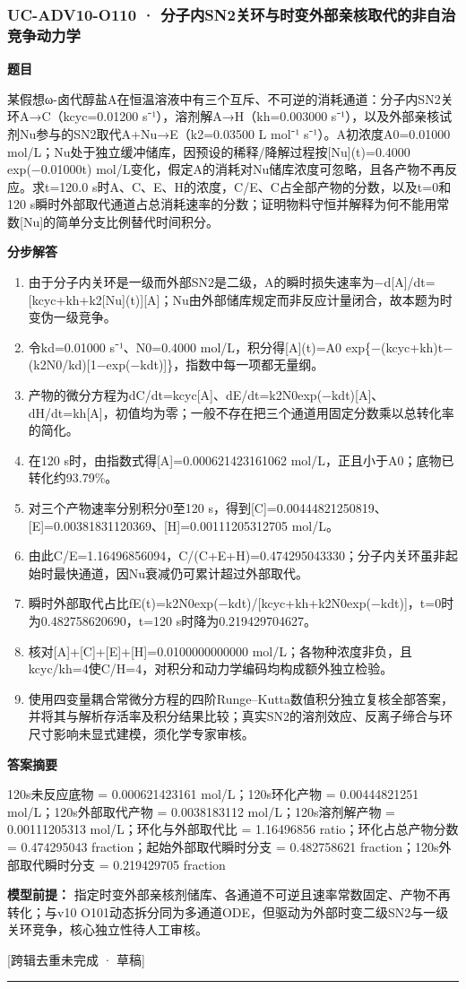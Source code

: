 \documentclass[UTF8,11pt,a4paper]{ctexart}
\begin{document}
\subsubsection*{UC-ADV10-O110 · 分子内SN2关环与时变外部亲核取代的非自治竞争动力学}
\noindent\textbf{题目}\par
某假想ω-卤代醇盐A在恒温溶液中有三个互斥、不可逆的消耗通道：分子内SN2关环A→C（kcyc=0.01200 s⁻¹），溶剂解A→H（kh=0.003000 s⁻¹），以及外部亲核试剂Nu参与的SN2取代A+Nu→E（k2=0.03500 L mol⁻¹ s⁻¹）。A初浓度A0=0.01000 mol/L；Nu处于独立缓冲储库，因预设的稀释/降解过程按[Nu](t)=0.4000 exp(−0.01000t) mol/L变化，假定A的消耗对Nu储库浓度可忽略，且各产物不再反应。求t=120.0 s时A、C、E、H的浓度，C/E、C占全部产物的分数，以及t=0和120 s瞬时外部取代通道占总消耗速率的分数；证明物料守恒并解释为何不能用常数[Nu]的简单分支比例替代时间积分。\par
\medskip\noindent\textbf{分步解答}
\begin{enumerate}
\item 由于分子内关环是一级而外部SN2是二级，A的瞬时损失速率为−d[A]/dt=[kcyc+kh+k2[Nu](t)][A]；Nu由外部储库规定而非反应计量闭合，故本题为时变伪一级竞争。
\item 令kd=0.01000 s⁻¹、N0=0.4000 mol/L，积分得[A](t)=A0 exp\{−(kcyc+kh)t−(k2N0/kd)[1−exp(−kdt)]\}，指数中每一项都无量纲。
\item 产物的微分方程为dC/dt=kcyc[A]、dE/dt=k2N0exp(−kdt)[A]、dH/dt=kh[A]，初值均为零；一般不存在把三个通道用固定分数乘以总转化率的简化。
\item 在120 s时，由指数式得[A]=0.000621423161062 mol/L，正且小于A0；底物已转化约93.79\%。
\item 对三个产物速率分别积分0至120 s，得到[C]=0.00444821250819、[E]=0.00381831120369、[H]=0.00111205312705 mol/L。
\item 由此C/E=1.16496856094，C/(C+E+H)=0.474295043330；分子内关环虽非起始时最快通道，因Nu衰减仍可累计超过外部取代。
\item 瞬时外部取代占比fE(t)=k2N0exp(−kdt)/[kcyc+kh+k2N0exp(−kdt)]，t=0时为0.482758620690，t=120 s时降为0.219429704627。
\item 核对[A]+[C]+[E]+[H]=0.0100000000000 mol/L；各物种浓度非负，且kcyc/kh=4使C/H=4，对积分和动力学编码均构成额外独立检验。
\item 使用四变量耦合常微分方程的四阶Runge–Kutta数值积分独立复核全部答案，并将其与解析存活率及积分结果比较；真实SN2的溶剂效应、反离子缔合与环尺寸影响未显式建模，须化学专家审核。
\end{enumerate}
\noindent\textbf{答案摘要}\par
120s未反应底物 = 0.000621423161 mol/L；120s环化产物 = 0.00444821251 mol/L；120s外部取代产物 = 0.0038183112 mol/L；120s溶剂解产物 = 0.00111205313 mol/L；环化与外部取代比 = 1.16496856 ratio；环化占总产物分数 = 0.474295043 fraction；起始外部取代瞬时分支 = 0.482758621 fraction；120s外部取代瞬时分支 = 0.219429705 fraction\par
\noindent\textbf{模型前提：}
指定时变外部亲核剂储库、各通道不可逆且速率常数固定、产物不再转化；与v10 O101动态拆分同为多通道ODE，但驱动为外部时变二级SN2与一级关环竞争，核心独立性待人工审核。\par
\noindent\textcolor{red!65!black}{[跨辑去重未完成 · 草稿]} \par
\medskip\hrule\medskip
{}
\end{document}
